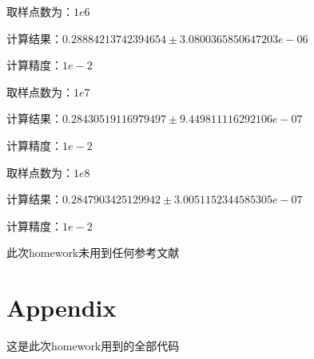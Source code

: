 \documentclass{article}
\begin{document}
	取样点数为：$1e6$

	计算结果：$0.28884213742394654 \pm 3.0800365850647203e-06$

	计算精度：$1e-2$	
	
	取样点数为：$1e7$
	
	计算结果：$0.28430519116979497 \pm 9.449811116292106e-07$
	
	计算精度：$1e-2$
	
	取样点数为：$1e8$

	计算结果：$0.2847903425129942 \pm 3.0051152344585305e-07$

	计算精度：$1e-2$	
	
	
	\begin{thebibliography}{9}
		此次homework未用到任何参考文献
	\end{thebibliography}
	
	\newpage 
	\appendix %
	\section*{Appendix}
	这是此次homework用到的全部代码
	
\end{document}
